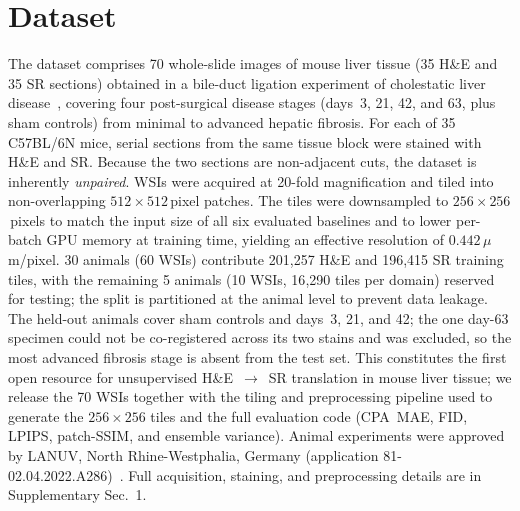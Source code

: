 \section{Dataset}
\label{sec:dataset}

The dataset comprises 70 whole-slide images of mouse liver tissue
(35 H\&E and 35 SR sections) obtained in a bile-duct ligation experiment of cholestatic
liver disease~\cite{ghallab2025asbt}, covering four post-surgical disease stages
(days~3, 21, 42, and 63, plus sham controls) from minimal to advanced hepatic fibrosis.
For each of 35 C57BL/6N mice, serial sections from the same tissue block were stained
with H\&E and SR. Because the two sections are non-adjacent cuts, the dataset is
inherently \emph{unpaired}.
WSIs were acquired at 20-fold magnification and tiled into non-overlapping
$512{\times}512$\,pixel patches. The tiles were downsampled to $256{\times}256$\,pixels
to match the input size of all six evaluated baselines and to lower per-batch GPU
memory at training time, yielding an effective resolution of $0.442\,\mu$m/pixel.
30 animals (60 WSIs) contribute 201{,}257 H\&E and 196{,}415 SR training tiles, with
the remaining 5 animals (10 WSIs, 16{,}290 tiles per domain) reserved for testing;
the split is partitioned at the animal level to prevent data leakage.
The held-out animals cover sham controls and days~3, 21, and 42; the one day-63
specimen could not be co-registered across its two stains and was excluded, so the
most advanced fibrosis stage is absent from the test set.
This constitutes the first open resource for unsupervised H\&E~$\to$~SR translation in
mouse liver tissue; we release the 70 WSIs together with the tiling
and preprocessing pipeline used to generate the $256{\times}256$ tiles and the full
evaluation code (CPA~MAE, FID, LPIPS, patch-SSIM, and ensemble variance).
Animal experiments were approved by LANUV, North Rhine-Westphalia, Germany
(application 81-02.04.2022.A286)~\cite{ghallab2025asbt}. Full
acquisition, staining, and preprocessing details are in Supplementary Sec.~1.
%
%
%
